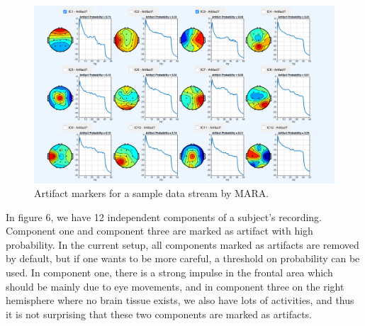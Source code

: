 \documentclass[a4paper,11pt,oneside]{article}
\begin{document}
		\begin{figure}[!h]
			\begin{center}
				\includegraphics[width=\textwidth]{img/ica}
			\end{center}
			\caption{Artifact markers for a sample data stream by MARA.}
		\end{figure}
	In figure 6, we have 12 independent components of a subject's recording. Component one and component three are marked as artifact with high probability. In the current setup, all components marked as artifacts are removed by default, but if one wants to be more careful, a threshold on probability can be used. In component one, there is a strong impulse in the frontal area which should be mainly due to eye movements, and in component three on the right hemisphere where no brain tissue exists, we also have lots of activities, and thus it is not surprising that these two components are marked as artifacts.
	
\end{document}
